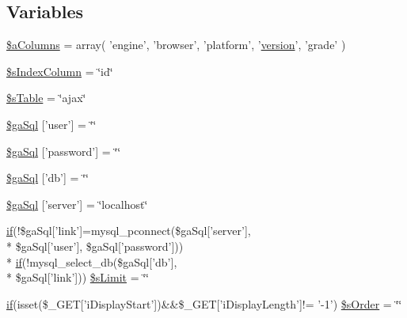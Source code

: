 \subsection*{Variables}
\begin{DoxyCompactItemize}
\item 
\hyperlink{examples_2server__side_2scripts_2server__processing_8php_aba12f5ba193beb8beb9fdd0a758711e8}{\$a\+Columns} = array( 'engine', 'browser', 'platform', '\hyperlink{jquery-ui_8js_a8fa514f3aed7ddc8bfb00ed5aea5b5e2}{version}', 'grade' )
\item 
\hyperlink{examples_2server__side_2scripts_2server__processing_8php_a8bddf0b8ded9777b9068de5fa9e217a2}{\$s\+Index\+Column} = \char`\"{}id\char`\"{}
\item 
\hyperlink{examples_2server__side_2scripts_2server__processing_8php_a6b7d3b9c752a0c977de5ddae78b522a9}{\$s\+Table} = \char`\"{}ajax\char`\"{}
\item 
\hyperlink{examples_2server__side_2scripts_2server__processing_8php_a08fc9fba5bf358871d1f80066f8930d1}{\$ga\+Sql} \mbox{[}'user'\mbox{]} = \char`\"{}\char`\"{}
\item 
\hyperlink{examples_2server__side_2scripts_2server__processing_8php_a5a7f7a53d25bfc58a76a0132750c80eb}{\$ga\+Sql} \mbox{[}'password'\mbox{]} = \char`\"{}\char`\"{}
\item 
\hyperlink{examples_2server__side_2scripts_2server__processing_8php_aaa5ffcba6d18eacf65c42024605b6486}{\$ga\+Sql} \mbox{[}'db'\mbox{]} = \char`\"{}\char`\"{}
\item 
\hyperlink{examples_2server__side_2scripts_2server__processing_8php_a23a651ce4e9cd3741cb88709c0bfdf8e}{\$ga\+Sql} \mbox{[}'server'\mbox{]} = \char`\"{}localhost\char`\"{}
\item 
\hyperlink{fullpage_2plugin_8js_a8b98017e64ef036adb9ae327ff94abe1}{if}(!\$ga\+Sql\mbox{[}'link'\mbox{]}=mysql\+\_\+pconnect(\$ga\+Sql\mbox{[}'server'\mbox{]}, \\*
\$ga\+Sql\mbox{[}'user'\mbox{]}, \$ga\+Sql\mbox{[}'password'\mbox{]})) \\*
\hyperlink{fullpage_2plugin_8js_a8b98017e64ef036adb9ae327ff94abe1}{if}(!mysql\+\_\+select\+\_\+db(\$ga\+Sql\mbox{[}'db'\mbox{]}, \\*
\$ga\+Sql\mbox{[}'link'\mbox{]})) \hyperlink{examples_2server__side_2scripts_2server__processing_8php_a867f070c3b4e597275c622aac60de587}{\$s\+Limit} = \char`\"{}\char`\"{}
\item 
\hyperlink{fullpage_2plugin_8js_a8b98017e64ef036adb9ae327ff94abe1}{if}(isset(\$\+\_\+\+G\+E\+T\mbox{[}'i\+Display\+Start'\mbox{]})\&\&\$\+\_\+\+G\+E\+T\mbox{[}'i\+Display\+Length'\mbox{]}!= '-\/1') \hyperlink{examples_2server__side_2scripts_2server__processing_8php_a4943002271f61f76fd87176bc8b923bf}{\$s\+Order} = \char`\"{}\char`\"{}

\end{DoxyCompactItemize}
